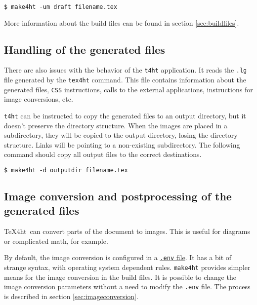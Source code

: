 \begin{verbatim}
$ make4ht -um draft filename.tex
\end{verbatim}

More information about the build files can be found in section
\ref{sec:buildfiles}.

\hypertarget{handling-of-the-generated-files}{%
\subsection{Handling of the generated
files}\label{handling-of-the-generated-files}}

\label{sec:output-dir}

There are also issues with the behavior of the \texttt{t4ht}
application. It reads the \texttt{.lg} file generated by the
\texttt{tex4ht} command. This file contains information about the
generated files, \texttt{CSS} instructions, calls to the external
applications, instructions for image conversions, etc.

\texttt{t4ht} can be instructed to copy the generated files to an output
directory, but it doesn't preserve the directory structure. When the
images are placed in a\\
subdirectory, they will be copied to the output directory, losing the
directory structure. Links will be pointing to a non-existing
subdirectory. The following command should copy all output files to the
correct destinations.

\begin{verbatim}
$ make4ht -d outputdir filename.tex
\end{verbatim}

\hypertarget{image-conversion-and-postprocessing-of-the-generated-files}{%
\subsection{Image conversion and postprocessing of the generated
files}\label{image-conversion-and-postprocessing-of-the-generated-files}}

\TeX4ht~can convert parts of the document to images. This is useful for
diagrams or complicated math, for example.

By default, the image conversion is configured in a
\href{https://www.tug.org/applications/tex4ht/mn34.html\#mn35.html}{\texttt{.env}
file}. It has a bit of strange syntax, with operating system dependent
rules. \texttt{make4ht} provides simpler means for the image conversion
in the build files. It is possible to change the image conversion
parameters without a need to modify the \texttt{.env} file. The process
is described in section \ref{sec:imageconversion}.

